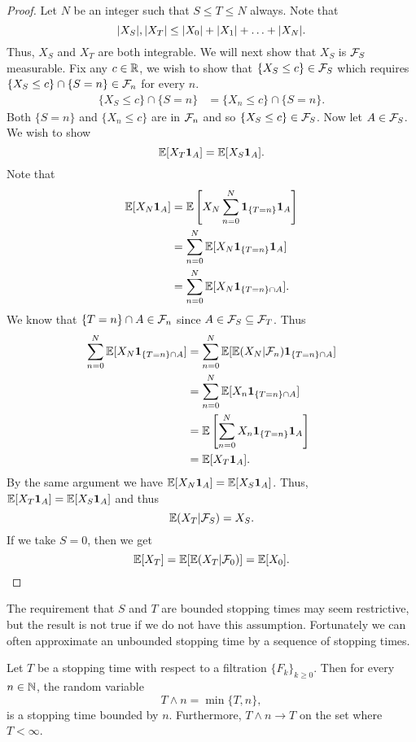\begin{proof}
    Let $N$ be an integer such that $S \le T \le N$ always. Note that
    \[{\left\lvert X_S\right\rvert},{\left\lvert X_T\right\rvert} \le {\left\lvert X_0\right\rvert}+{\left\lvert X_1\right\rvert}+\ldots+{\left\lvert X_N\right\rvert}. \]
    Thus, $X_S$ and $X_T$ are both integrable. We will next show that $X_S$ is ${\mathcal{F}}_S$ measurable. Fix any $c \in {\mathbb R}$, we wish to show that $\{X_S \le c \} \in {\mathcal{F}}_S$ which requires $\{X_S \le c\} \cap\{S =n\} \in {\mathcal{F}}_n$ for every $n$.
    \begin{align*}
        \{X_S \le c\} \cap \{S = n\} &= \{X_n \le c\} \cap\{ S=n\}.
    \end{align*}
    Both $\{S=n\}$ and $\{X_n \le c\}$ are in ${\mathcal{F}}_n$ and so $\{X_S \le c\} \in {\mathcal{F}}_S$. Now let $A \in {\mathcal{F}}_S$. We wish to show
    \[{\mathbb{E}}[X_T {{\bf 1}}_A] = {\mathbb{E}}[X_S {{\bf 1}}_A]. \]
    Note that
    \begin{align*}
        {\mathbb{E}}[X_N {{\bf 1}}_A]&={\mathbb{E}}\left[X_N \sum_{n=0}^N {{\bf 1}}_{\{T=n\}}{{\bf 1}}_A\right]\\
        &=\sum_{n=0}^N {\mathbb{E}}[X_N {{\bf 1}}_{\{T=n\}}{{\bf 1}}_A]\\
        &=\sum_{n=0}^N {\mathbb{E}}[X_N {{\bf 1}}_{\{T=n\}\cap A}].
    \end{align*}
    We know that $\{T=n\} \cap A \in {\mathcal{F}}_n$ since $A \in {\mathcal{F}}_S \subseteq {\mathcal{F}}_T$. Thus 
    \begin{align*}
        \sum_{n=0}^N {\mathbb{E}}[X_N {{\bf 1}}_{\{T=n\}\cap A}]&=\sum_{n=0}^N {\mathbb{E}}[{\mathbb{E}}(X_N|{\mathcal{F}}_n) {{\bf 1}}_{\{T=n\}\cap A}]\\
        &=\sum_{n=0}^N {\mathbb{E}}[X_n {{\bf 1}}_{\{T=n\}\cap A}]\\
        &={\mathbb{E}}\left[\sum_{n=0}^N X_n {{\bf 1}}_{\{T=n\}}  {{\bf 1}}_A\right]\\
        &={\mathbb{E}}[X_T{{\bf 1}}_A].
    \end{align*}
    By the same argument we have ${\mathbb{E}}[X_N {{\bf 1}}_A] = {\mathbb{E}}[X_S {{\bf 1}}_A]$. Thus, ${\mathbb{E}}[X_T {{\bf 1}}_A]={\mathbb{E}}[X_S {{\bf 1}}_A]$ and thus 
    \[{\mathbb{E}}(X_T|{\mathcal{F}}_S)= X_S. \]
    If we take $S=0$, then we get 
    \[{\mathbb{E}}[X_T] = {\mathbb{E}}[{\mathbb{E}}(X_T|{\mathcal{F}}_0)]={\mathbb{E}}[X_0].\qedhere  \]
\end{proof}
The requirement that $S$ and $T$ are bounded stopping times may seem restrictive, but the result is not true if we do not have this assumption. Fortunately we can often approximate an unbounded stopping time by a sequence of stopping times.
\begin{proposition}
    Let $T$ be a stopping time with respect to a filtration $\{F_k\}_{k \ge 0}$. Then for every $n \in {{\mathbb N}}$, the random variable
    \[T \land n = \min\{T,n\}, \]
    is a stopping time bounded by $n$. Furthermore, $T \land n \to T$ on the set where $T < \infty$. 
\end{proposition}
